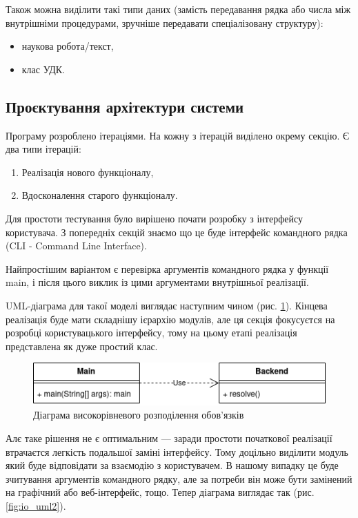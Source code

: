 \documentclass[14pt]{extarticle}
\begin{document}
  Також можна виділити такі типи даних (замість передавання рядка або числа між внутрішніми процедурами, зручніше передавати спеціалізовану структуру):
  \begin{itemize}[labelindent=\dimexpr{}\relax, leftmargin=*]
    \item наукова робота/текст,
    \item клас УДК.
  \end{itemize}

  \subsection{Проєктування архітектури системи}
  Програму розроблено ітераціями. На кожну з ітерацій виділено окрему секцію. Є два типи ітерацій:
  \begin{enumerate}[labelindent=\dimexpr\parindent*2\relax, leftmargin=*]
    \item Реалізація нового функціоналу,
    \item Вдосконалення старого функціоналу.
  \end{enumerate}
  Для простоти тестування було вирішено почати розробку з інтерфейсу користувача.
  З попередніх секцій знаємо що це буде інтерфейс командного рядка
  (CLI - Command Line Interface).

  Найпростішим варіантом
  є перевірка аргументів командного рядка у функції main,
  і після цього виклик із цими аргументами внутрішньої реалізації.

  UML-діаграма для такої моделі виглядає наступним чином
  (рис. \ref{fig:io_uml1}).
  Кінцева реалізація буде мати складнішу ієрархію модулів,
  але ця секція фокусуєтся на розробці користувацького інтерфейсу,
  тому на цьому етапі реалізація представлена як дуже простий клас.

  \begin{figure}[H]
    \centering
    \includegraphics{io_uml1.drawio.png}    
    \captionsetup{justification=centering}  
    \caption{Діаграма високорівневого розподілення обов'язків}
    \label{fig:io_uml1}
  \end{figure}

  Алє таке рішення не є оптимальним ---
  заради простоти початкової реалізації
  втрачаєтся легкість подальшої заміні інтерфейсу.
  Тому доцільно виділити модуль який буде відповідати
  за взаємодію з користувачем.
  В нашому випадку це буде зчитування аргументів командного рядку,
  але за потреби він може бути замінений на графічний або веб-інтерфейс, тощо.
  Тепер діаграма виглядає так (рис. \ref{fig:io_uml2}).
\end{document}
